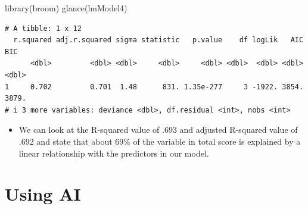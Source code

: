 \documentclass[
  letterpaper,
  DIV=11,
  numbers=noendperiod]{scrreprt}
\newenvironment{Shaded}{\begin{snugshade}}{\end{snugshade}}
\newcommand{\FunctionTok}[1]{\textcolor[rgb]{0.28,0.35,0.67}{#1}}
\newcommand{\NormalTok}[1]{\textcolor[rgb]{0.00,0.23,0.31}{#1}}
\providecommand{\tightlist}{%
  \setlength{\itemsep}{0pt}\setlength{\parskip}{0pt}}\usepackage{longtable,booktabs,array}
\begin{document}
\begin{Shaded}
\begin{Highlighting}[]
\FunctionTok{library}\NormalTok{(broom)}
\FunctionTok{glance}\NormalTok{(lmModel4)}
\end{Highlighting}
\end{Shaded}

\begin{verbatim}
# A tibble: 1 x 12
  r.squared adj.r.squared sigma statistic   p.value    df logLik   AIC   BIC
      <dbl>         <dbl> <dbl>     <dbl>     <dbl> <dbl>  <dbl> <dbl> <dbl>
1     0.702         0.701  1.48      831. 1.35e-277     3 -1922. 3854. 3879.
# i 3 more variables: deviance <dbl>, df.residual <int>, nobs <int>
\end{verbatim}

\begin{itemize}
\tightlist
\item
  We can look at the R-squared value of .693 and adjusted R-squared
  value of .692 and state that about 69\% of the variable in total score
  is explained by a linear relationship with the predictors in our
  model.
\end{itemize}


\chapter{Using AI}\label{using-ai-6}
\end{document}
